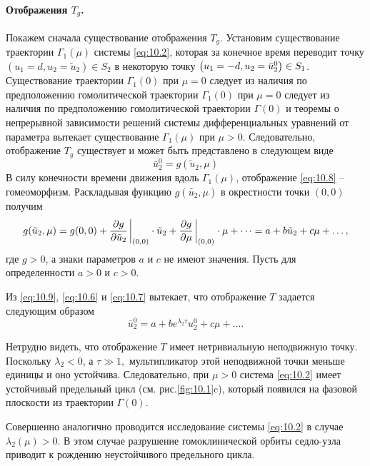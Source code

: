 \paragraph{Отображения $T_g$.}%
Покажем сначала существование отображения $T_g$. Установим существование траектории
$\Gamma_{1}(\mu)$ системы \eqref{eq:10.2}, которая за конечное время переводит точку 
$(u_{1}=d, u_{2} = \tilde u_{2}) \in S_{2}$ в некоторую точку 
$\qty(u_{1}=-d,u_{2}= \bar u_{2}^{0}) \in S_{1}$. Существование траектории $\Gamma_{1}(0)$ 
при $\mu = 0$ следует из наличия по предположению гомолитической траектории $\Gamma_{1}(0)$ 
при $\mu=0$ следует из наличия по предположению гомолитической траектории $\Gamma(0)$ и теоремы о 
непрерывной зависимости решений системы дифференциальных уравнений от параметра вытекает 
существование $\Gamma_{1}(\mu)$ при $\mu>0$. Следовательно, отображение $T_g$ существует и может быть представлено
в следующем виде
\begin{equation}
        \label{eq:10.8}
        \bar{u}_{2}^{0} = g( \tilde u_{2},\mu)
\end{equation}
В силу конечности времени движения вдоль $\Gamma_{1}(\mu)$, отображение \eqref{eq:10.8} --
гомеоморфизм. Раскладывая функцию $g(\tilde{u_{2}}, \mu)$ в окрестности точки $(0,0)$ 
получим  
\begin{equation}
        \label{eq:10.9}
        g(\tilde u_{2}, \mu) = g(0,0) + \pdv{g}{\tilde u_{2}} \eval_{(0,0)}
        \cdot \tilde u_{2} + \pdv{g}{\mu} \eval_{(0,0)} \cdot \mu + \dots =
        a+ b \tilde u_{2} + c \mu + \dots,
\end{equation}
где $g>0$, а знаки параметров $a$ и $c$ не имеют значения. Пусть для определенности
$a>0$ и $c>0$.

Из \eqref{eq:10.9}, \eqref{eq:10.6} и \eqref{eq:10.7} вытекает, что отображение $T$ задается следующим образом
\begin{equation}
        \label{eq:10.10}
        \bar u_{2}^{0} = a + b e^{\lambda_{2}\tau} u_{2}^{0} + c\mu+ \dots.
\end{equation}

Нетрудно видеть, что отображение $T$ имеет нетривиальную неподвижную точку. Поскольку 
$\lambda_{2} < 0$, а $\tau\gg 1,$ мультипликатор этой неподвижной точки меньше единицы
и оно устойчива. Следовательно, при $\mu > 0 $ система \eqref{eq:10.2} имеет устойчивый 
предельный цикл (см. рис.\ref{fig:10.1}c), который появился на фазовой плоскости из траектории
$\Gamma(0)$.

Совершенно аналогично проводится исследование системы \eqref{eq:10.2} в случае 
$\lambda_{2}(\mu) >0$. В этом случае разрушение гомоклинической орбиты седло-узла
приводит к рождению неустойчивого предельного цикла.

